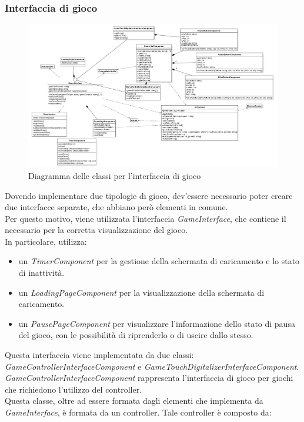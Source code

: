 \subsubsection{Interfaccia di gioco}
\begin{figure}[h]
    \centering
    \includegraphics[width=340pt]{ProgettazioneTecnica/GameInterface.png}
    \caption{Diagramma delle classi per l'interfaccia di gioco}
    \label{fig:gameinterface}
\end{figure}
Dovendo implementare due tipologie di gioco, dev'essere necessario poter creare due interfacce separate, che abbiano però elementi in comune.\\
Per questo motivo, viene utilizzata l'interfaccia \emph{GameInterface}, che contiene il necessario per la corretta visualizzazione del gioco.\\
In particolare, utilizza:
\begin{itemize}
    \item un \emph{TimerComponent} per la gestione della schermata di caricamento e lo stato di inattività.
    \item un \emph{LoadingPageComponent} per la visualizzazione della schermata di caricamento.
    \item un \emph{PausePageComponent} per visualizzare l'informazione dello stato di pausa del gioco, con le possibilità di riprenderlo o di uscire dallo stesso.
\end{itemize}
Questa interfaccia viene implementata da due classi: \emph{GameControllerInterfaceComponent} e \emph{GameTouchDigitalizerInterfaceComponent}.
\newpage
{}
\emph{GameControllerInterfaceComponent} rappresenta l'interfaccia di gioco per giochi che richiedono l'utilizzo del controller.\\
Questa classe, oltre ad essere formata dagli elementi che implementa da \emph{GameInterface}, è formata da un controller. Tale controller è composto da:
